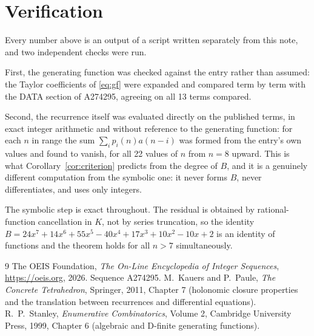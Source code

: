 \documentclass[11pt,a4paper]{article}
\theoremstyle{plain}
\theoremstyle{definition}
\begin{document}
\section{Verification}

Every number above is an output of a script written separately from this note, and two
independent checks were run.

First, the generating function was checked against the entry rather than assumed: the
Taylor coefficients of \eqref{eq:gf} were expanded and compared term by term with the DATA
section of A274295, agreeing on all 13 terms compared.

Second, the recurrence itself was evaluated directly on the published terms, in exact
integer arithmetic and without reference to the generating function: for each $n$ in range
the sum $\sum_{i}p_{i}(n)a(n-i)$ was formed from the entry's own values and found to
vanish, for all 22 values of $n$ from $n=8$ upward. This is what
Corollary~\ref{cor:criterion} predicts from the degree of $B$, and it is a genuinely
different computation from the symbolic one: it never forms $B$, never differentiates, and
uses only integers.

The symbolic step is exact throughout. The residual is obtained by rational-function
cancellation in $K$, not by series truncation, so the identity $B=24 x^{7} + 14 x^{6} + 55 x^{5} - 40 x^{4} + 17 x^{3} + 10 x^{2} - 10 x + 2$ is an
identity of functions and the theorem holds for all $n>7$ simultaneously.

\begin{thebibliography}{9}
 The OEIS Foundation, \emph{The On-Line Encyclopedia of Integer Sequences},
\url{https://oeis.org}, 2026. Sequence A274295.
 M.~Kauers and P.~Paule, \emph{The Concrete Tetrahedron}, Springer, 2011,
Chapter 7 (holonomic closure properties and the translation between recurrences and
differential equations).
 R.~P.~Stanley, \emph{Enumerative Combinatorics}, Volume 2, Cambridge
University Press, 1999, Chapter 6 (algebraic and D-finite generating functions).
\end{thebibliography}
\end{document}
